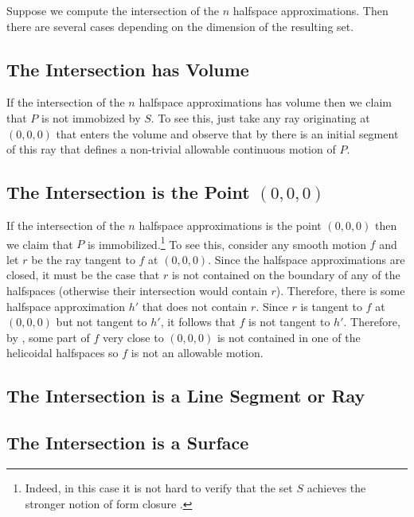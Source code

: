 \documentclass[lotsofwhite,charterfonts]{patmorin}
\begin{document}
Suppose we compute the intersection of the $n$ halfspace approximations.  Then
there are several cases depending on the dimension of the resulting set.

\subsection{The Intersection has Volume}

If the intersection of the $n$ halfspace approximations has volume then we
claim that $P$ is not immobized by $S$.  To see this, just take any ray
originating at $(0,0,0)$ that enters the volume and observe that by 
there is an initial segment of this ray that defines a non-trivial allowable
continuous motion of $P$.

\subsection{The Intersection is the Point $(0,0,0)$}

If the intersection of the $n$ halfspace approximations is the point $(0,0,0)$
then we claim that $P$ is immobilized.\footnote{Indeed, in this case it is not
hard to verify that the set $S$ achieves the stronger notion of form closure
\cite{X}.}  To see this, consider any smooth motion $f$ and let $r$ be the ray
tangent to $f$ at $(0,0,0)$.  Since the halfspace approximations are closed, it
must be the case that $r$ is not contained on the boundary of any of the
halfspaces (otherwise their intersection would contain $r$).  Therefore, there
is some halfspace approximation $h'$ that does not contain $r$.  Since $r$ is
tangent to $f$ at $(0,0,0)$ but not tangent to $h'$, it follows that $f$ is not
tangent to $h'$.  Therefore, by , some part of $f$ very close to
$(0,0,0)$ is not contained in one of the helicoidal halfspaces so $f$ is not an
allowable motion. 

\subsection{The Intersection is a Line Segment or Ray}


\subsection{The Intersection is a Surface}
\end{document}
